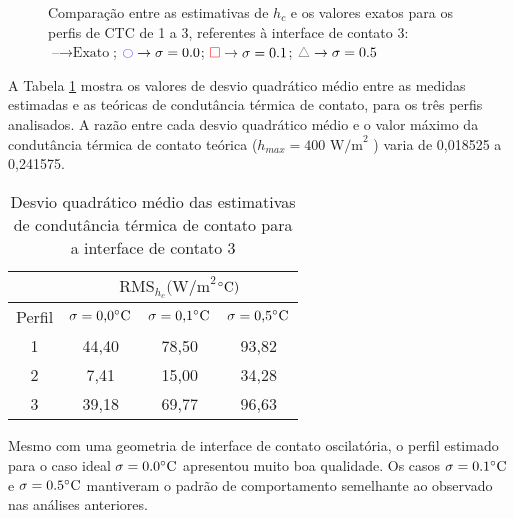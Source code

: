\begin{figure}[H]
	\caption{Comparação entre as estimativas de $h_c$ e os valores exatos para os perfis de CTC de 1 a 3, referentes à interface de contato 3: $\text{--} \rightarrow \text{Exato}$; $\textcolor{blue}{\ocircle} \rightarrow \sigma = 0.0$; $\textcolor{red}{\square} \rightarrow \sigma = 0.1$; $\textcolor{gray}{\triangle} \rightarrow \sigma = 0.5$}
	\label{figura_ctc_interface_03}
\end{figure}

A Tabela \ref{tabela_rms_ctc_interface_3} mostra os valores de desvio quadrático médio entre as medidas estimadas e as teóricas de condutância térmica de contato, para os três perfis analisados. A razão entre cada desvio quadrático médio e o valor máximo da condutância térmica de contato teórica ($h_{max} = 400 \text{ W/m}^2$ \celsius) varia de 0,018525 a 0,241575.
\begin{table}[H]
	\centering
	\caption{Desvio quadrático médio das estimativas de condutância térmica de contato para a interface de contato 3}
	\begin{tabular}{c|c|c|c|}
		\cline{2-4}
		& \multicolumn{3}{c|}{$\text{RMS}_{h_c}(\text{W/m}^{2}$$\celsius)$} \\ \hline
		\multicolumn{1}{|c|}{Perfil} & $\sigma = \text{0,0}\celsius$   & $\sigma = \text{0,1}\celsius$    & $\sigma = \text{0,5}\celsius$  \\ \hline
		\multicolumn{1}{|c|}{1}      & 44,40       & 78,50       & 93,82      \\ \hline
		\multicolumn{1}{|c|}{2}      & 7,41       & 15,00       & 34,28      \\ \hline
		\multicolumn{1}{|c|}{3}      & 39,18       & 69,77       &  96,63   \\ \hline
	\end{tabular}
	\label{tabela_rms_ctc_interface_3}
\end{table}

Mesmo com uma geometria de interface de contato oscilatória, o perfil estimado para o caso ideal $\sigma = 0.0\celsius$ apresentou muito boa qualidade. Os casos $\sigma = 0.1\celsius$ e $\sigma = 0.5\celsius$  mantiveram o padrão de comportamento semelhante ao observado nas análises anteriores.